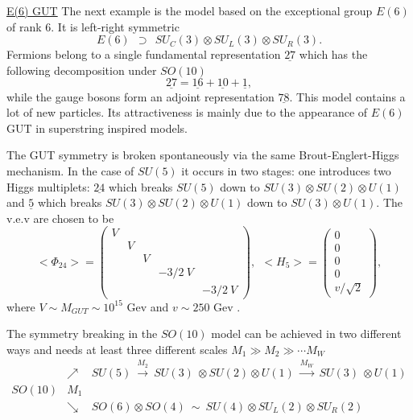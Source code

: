 \documentclass{cernyrep}
\begin{document}
\underline{E(6)  GUT}  The next example is the  model based on the exceptional group $E(6)$ of rank 6. It is
left-right symmetric
$$E(6) \ \ \supset \ \ SU_C(3) \otimes SU_L(3) \otimes SU_R(3).$$
Fermions belong to a single fundamental representation $\underline
 {27}$ which has the following decomposition under $SO(10)$
$$\underline {27} = \underline {16} + \underline {10} +
\underline 1 ,$$
while the gauge bosons form an adjoint representation $\underline
 {78}$.
This model contains a lot of new particles. Its attractiveness is
mainly due to the appearance of $E(6)$ GUT in superstring inspired
models.

The GUT symmetry is broken spontaneously via the same Brout-Englert-Higgs mechanism.
In the case of $SU(5)$ it occurs in two stages: one introduces two Higgs multiplets:
$\underline {24} $ which breaks $SU(5)$ down to $SU(3) \otimes SU(2) \otimes U(1) $ and $\underline 5$ which breaks $SU(3) \otimes SU(2) \otimes U(1)$ down to $SU(3) \otimes U(1)$. The v.e.v are chosen to be
$$ <\Phi_{24}> = \left ( \begin{array}{ccccc}
V & & & &  \\  & V & & &  \\  &  & V &  &   \\  &  &  & -3/2 \ V &  \\
  &  &  &  &  -3/2 \ V  \end{array} \right ), \ \  <H_5> = \left ( \begin{array}{c} 0 \\ 0 \\ 0 \\ 0 \\
v/ \sqrt{2} \end{array} \right ) , $$
where $V \sim  M_{GUT} \sim 10^{15} $ Gev  and  $v \sim 250 $ Gev . 


The symmetry breaking in the $SO(10)$ model can be achieved in two different ways and needs at least three different scales
$M_1 \gg M_2 \gg \cdots M_W$
$$\begin{array}{ccl}
 & \nearrow & SU(5) \ \stackrel{M_2}{\rightarrow} \ SU(3) \
\otimes SU(2) \otimes U(1) \ \stackrel{M_W}{\rightarrow} \ SU(3) \
\otimes U(1) \\
SO(10) & M_1 &  \\
 & \searrow & SO(6) \otimes SO(4) \ \sim \ SU(4) \otimes SU_L(2)
\otimes SU_R(2)  \end{array} $$
\end{document}
